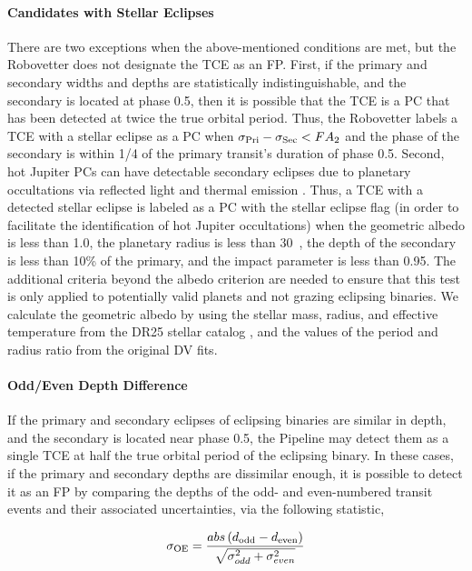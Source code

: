 \paragraph{Candidates with Stellar Eclipses}
\label{s:sscand}
There are two exceptions when the above-mentioned conditions are met, but the Robovetter does not designate the TCE as an FP. First, if the primary and secondary widths and depths are statistically indistinguishable, and the secondary is located at phase 0.5, then it is possible that the TCE is a PC that has been detected at twice the true orbital period. Thus, the Robovetter labels a TCE with a stellar eclipse as a PC when ${\sigma_{\rm Pri} - \sigma_{\rm Sec} < FA_{2}}$ and the phase of the secondary is within 1/4 of the primary transit's duration of phase 0.5. Second, hot Jupiter PCs can have detectable secondary eclipses due to planetary occultations via reflected light and thermal emission \citep{Coughlin2012}. Thus, a TCE with a detected stellar eclipse is labeled as a PC with the stellar eclipse flag (in order to facilitate the identification of hot Jupiter occultations) when the geometric albedo is less than 1.0, the planetary radius is less than 30~\re{}, the depth of the secondary is less than 10\% of the primary, and the impact parameter is less than 0.95. The additional criteria beyond the albedo criterion are needed to ensure that this test is only applied to potentially valid planets and not grazing eclipsing binaries. We calculate the geometric albedo by using the stellar mass, radius, and effective temperature from the DR25 stellar catalog \citep{Mathur2017ApJS}, and the values of the period and radius ratio from the original DV fits.



\paragraph{Odd/Even Depth Difference}

\label{s:oddeven}
If the primary and secondary eclipses of eclipsing binaries are similar in depth, and the secondary is located near phase 0.5, the \kepler{} Pipeline may detect them as a single TCE at half the true orbital period of the eclipsing binary. In these cases, if the primary and secondary depths are dissimilar enough, it is possible to detect it as an FP by comparing the depths of the odd- and even-numbered transit events and their associated uncertainties, via the following statistic,

\begin{equation}
\sigma_{\rm OE} = \frac{abs\left(d_{\rm odd} - d_{\rm even}\right)}{\sqrt{\sigma_{odd}^{2} + \sigma_{even}^{2}}} 
\end{equation}

